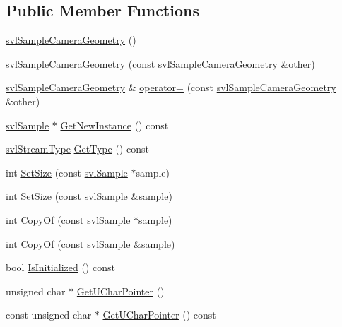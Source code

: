 \subsection*{Public Member Functions}
\begin{DoxyCompactItemize}
\item 
\hyperlink{classsvl_sample_camera_geometry_a22c6f6d8cb45fec2b643c568fbda4ad7}{svl\-Sample\-Camera\-Geometry} ()
\item 
\hyperlink{classsvl_sample_camera_geometry_a8f41f22e66cd08bd2dd82057caf71687}{svl\-Sample\-Camera\-Geometry} (const \hyperlink{classsvl_sample_camera_geometry}{svl\-Sample\-Camera\-Geometry} \&other)
\item 
\hyperlink{classsvl_sample_camera_geometry}{svl\-Sample\-Camera\-Geometry} \& \hyperlink{classsvl_sample_camera_geometry_a096223939bf1d43cd3753b849194674a}{operator=} (const \hyperlink{classsvl_sample_camera_geometry}{svl\-Sample\-Camera\-Geometry} \&other)
\item 
\hyperlink{classsvl_sample}{svl\-Sample} $\ast$ \hyperlink{classsvl_sample_camera_geometry_aa52d90abdf8e95655d57b4ee689a76e7}{Get\-New\-Instance} () const 
\item 
\hyperlink{svl_definitions_8h_aa00696d338a58db361335a01fd11e122}{svl\-Stream\-Type} \hyperlink{classsvl_sample_camera_geometry_aadbf751373210cc5017ab2c0a4a94034}{Get\-Type} () const 
\item 
int \hyperlink{classsvl_sample_camera_geometry_a091bd82f26b356bda32651c304cdd42d}{Set\-Size} (const \hyperlink{classsvl_sample}{svl\-Sample} $\ast$sample)
\item 
int \hyperlink{classsvl_sample_camera_geometry_acb38c234da3995da212df7a193df9de2}{Set\-Size} (const \hyperlink{classsvl_sample}{svl\-Sample} \&sample)
\item 
int \hyperlink{classsvl_sample_camera_geometry_a12731ae1bc5d0c7ece215739db4ac5a0}{Copy\-Of} (const \hyperlink{classsvl_sample}{svl\-Sample} $\ast$sample)
\item 
int \hyperlink{classsvl_sample_camera_geometry_ae1914f13bd00c1eae2ae546a581c0718}{Copy\-Of} (const \hyperlink{classsvl_sample}{svl\-Sample} \&sample)
\item 
bool \hyperlink{classsvl_sample_camera_geometry_afe8f2d20600de3aeea61dd5aa518c3a7}{Is\-Initialized} () const 
\item 
unsigned char $\ast$ \hyperlink{classsvl_sample_camera_geometry_a73a4d4f0d9bd6850dc46a264f6f07d52}{Get\-U\-Char\-Pointer} ()
\item 
const unsigned char $\ast$ \hyperlink{classsvl_sample_camera_geometry_ab6bb23a9c6e3babeed7e0f1fedc65100}{Get\-U\-Char\-Pointer} () const 

\end{DoxyCompactItemize}
